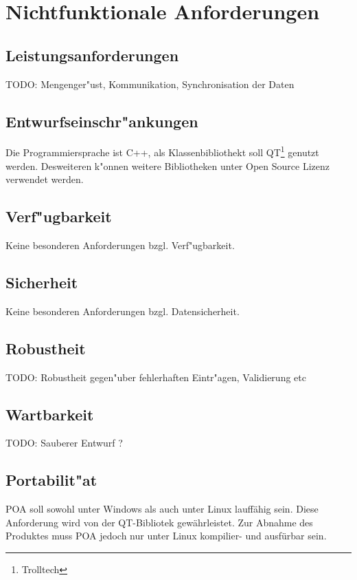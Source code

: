 ﻿\chapter{Nichtfunktionale Anforderungen}
\section{Leistungsanforderungen}
TODO: Mengenger"ust, Kommunikation, Synchronisation der Daten
\section{Entwurfseinschr"ankungen}
Die Programmiersprache ist C++, als Klassenbibliothekt soll QT\footnote{Trolltech} genutzt werden. Desweiteren k"onnen weitere 
Bibliotheken unter Open Source Lizenz verwendet werden.

\section{Verf"ugbarkeit}
Keine besonderen Anforderungen bzgl. Verf"ugbarkeit.

\section{Sicherheit}
Keine besonderen Anforderungen bzgl. Datensicherheit.
\section{Robustheit}
TODO: Robustheit gegen"uber fehlerhaften Eintr"agen, Validierung etc
\section{Wartbarkeit}
TODO: Sauberer Entwurf ?
\section{Portabilit"at}
POA soll sowohl unter Windows als auch unter Linux lauffähig sein. Diese Anforderung wird von der QT-Bibliotek gewährleistet.
Zur Abnahme des Produktes muss POA jedoch nur unter Linux kompilier- und ausfürbar sein.
